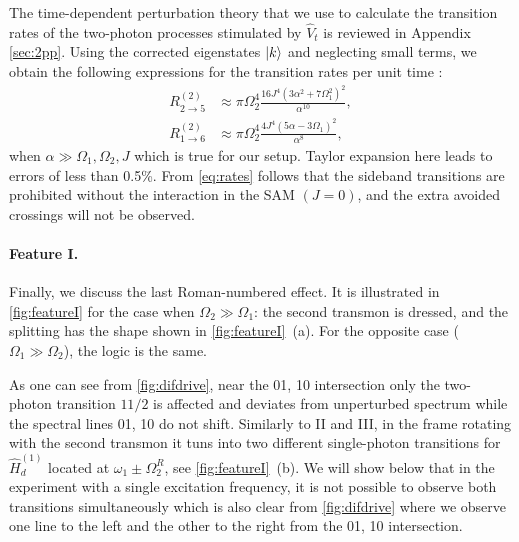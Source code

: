 \documentclass[%
 aps, prx,
 amsmath,amssymb,
 reprint,%
superscriptaddress
]{revtex4-2}
\begin{document}
The time-dependent perturbation theory that we use to calculate the transition rates of the two-photon processes stimulated by $\hat V_t$ is reviewed in Appendix \ref{sec:2pp}. Using the corrected eigenstates $\ket{k}$ and neglecting small terms, we obtain the following expressions for the transition rates per unit time \cite{faisal2013theory}:
\begin{equation}
\begin{aligned}
R^{(2)}_{2\rightarrow 5} &\approx \pi\Omega_2^4 
\frac{16 J^4 \left(3 \alpha^2 + 
\text{$7\Omega_1^2$}\right)^2}{\alpha 
^{10}},\\
R^{(2)}_{1\rightarrow 6} &\approx \pi\Omega_2^4 
\frac{4 J^4 \left(5 \alpha - \text{$3\Omega_1
		$}\right)^2}{\alpha ^{8}},
\end{aligned}\label{eq:rates}
\end{equation}
when $\alpha \gg \Omega_1, \Omega_2, J$ which is 
true for our setup. Taylor expansion here leads to errors of less than 0.5\%.  From \autoref{eq:rates} 
follows that the sideband transitions are 
prohibited without the interaction in the SAM 
$(J=0)$, and the extra avoided crossings will not 
be observed.

\paragraph{Feature I.} Finally, we discuss the 
last Roman-numbered effect. It is illustrated in 
\autoref{fig:featureI} for the case when 
$\Omega_2 \gg \Omega_1$: the second transmon is 
dressed, and the splitting has the shape shown in 
\autoref{fig:featureI}~(a). For the opposite case 
($\Omega_1 \gg \Omega_2$), the logic is the same. 

As one can see from \autoref{fig:difdrive}, near the 01, 10 intersection only the two-photon transition $11/2$ is affected and deviates from unperturbed spectrum while the spectral lines 01, 10 do not shift. Similarly to II and III, in the frame rotating with the second transmon it tuns into two different single-photon transitions for $\hat H_d^{(1)}$ located at $\omega_1 \pm \Omega_2^R$, see \autoref{fig:featureI}~(b). We will show below that in the experiment with a single excitation frequency, it is not possible to observe both transitions simultaneously which is also clear from \autoref{fig:difdrive} where we observe one line to the left and the other to the right from the 01, 10 intersection.
\end{document}
